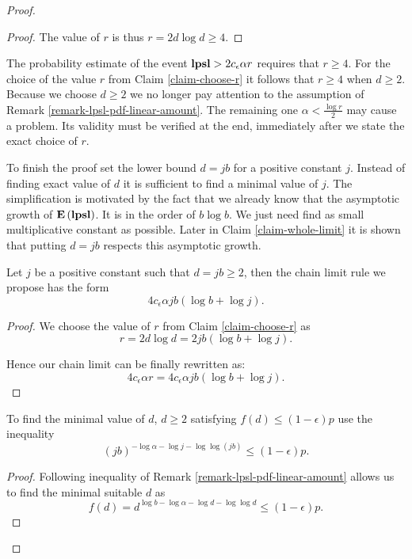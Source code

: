 \begin{proof}
\begin{proof}
The value of $r$ is thus $r = 2d \log d \geq 4$.
\end{proof}

The probability estimate of the event $\mathbf{lpsl} > 2 c_\epsilon \alpha r$ requires that $r \geq 4$. For the choice of the value $r$ from Claim \ref{claim-choose-r} it follows that $r \geq 4$ when $d \geq 2$. Because we choose $d \geq 2$ we no longer pay attention to the assumption of Remark \ref{remark-lpsl-pdf-linear-amount}. The remaining one $\alpha < \frac{\log r}{2}$ may cause a problem. Its validity must be verified at the end, immediately after we state the exact choice of $r$.

To finish the proof set the lower bound $d = j b$ for a positive constant $j$. Instead of finding exact value of $d$ it is sufficient to find a minimal value of $j$. The simplification is motivated by the fact that we already know that the asymptotic growth of $\mathbf{E}\left(\mathbf{lpsl}\right)$. It is in the order of $b \log b$. We just need find as small multiplicative constant as possible. Later in Claim \ref{claim-whole-limit} it is shown that putting $d = jb$ respects this asymptotic growth.

\begin{claim}
\label{claim-whole-limit}
Let $j$ be a positive constant such that $d = jb \geq 2 $, then the chain limit rule we propose has the form \[ 4 c_\epsilon \alpha j b (\log b + \log j) \text{.} \]
\end{claim}
\begin{proof}
We choose the value of $r$ from Claim \ref{claim-choose-r} as
\[
	r = 2 d \log d = 2 j b (\log b + \log j) \text{.}
\]

Hence our chain limit can be finally rewritten as:
\[
	4 c_\epsilon \alpha r = 4 c_\epsilon \alpha j b (\log b + \log j) \text{.}
\]
\end{proof}

\begin{claim}
To find the minimal value of $d$, $d \geq 2$ satisfying $f(d) \leq (1 - \epsilon) p$ use the inequality
\begin{equation}
\label{inequality-formula-j}
	\left(j b\right)^{-\log \alpha -\log j - \log \log (j b)} \leq (1 - \epsilon)p \text{.}
\end{equation}
\end{claim}
\begin{proof}
Following inequality of Remark \ref{remark-lpsl-pdf-linear-amount} allows us to find the minimal suitable $d$ as
\[
	f(d) = d ^ {\log b - \log \alpha - \log d - \log \log d} \leq (1 - \epsilon) p \text{.}
\]


\end{proof}
\end{proof}
